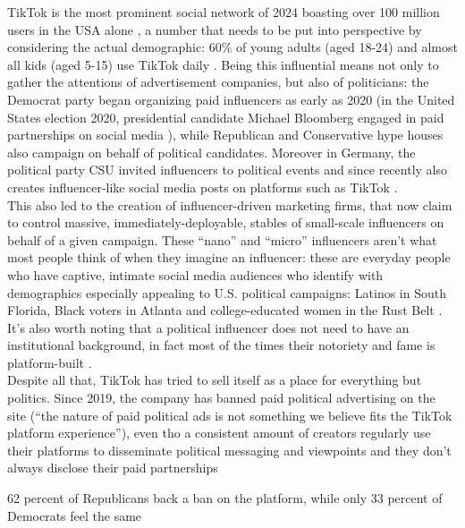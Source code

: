 TikTok is the most prominent social network of 2024 boasting over 100 million users in the USA alone \cite{tktkStat}, a number that needs to be put into perspective by considering the actual demographic: 60\% of young adults (aged 18-24) and almost all kids (aged 5-15) use TikTok daily \cite{https://doi.org/10.1002/poi3.287}. Being this influential means not only to gather the attentions of advertisement companies, but also of politicians: the Democrat party began organizing paid influencers as early as 2020 (in the United States election 2020, presidential candidate Michael Bloomberg engaged in paid partnerships on social media \cite{10.3389/fcomm.2021.752656}), while Republican and Conservative hype houses also campaign on behalf of political candidates. Moreover in Germany, the political party CSU invited influencers to political events and since recently also creates influencer-like social media posts on platforms such as TikTok \cite{10.3389/fcomm.2021.752656}.\\
This also led to the creation of influencer-driven marketing firms, that now claim to control massive, immediately-deployable, stables of small-scale influencers on behalf of a given campaign. These “nano” and “micro” influencers aren't what most people think of when they imagine an influencer: these are everyday people who have captive, intimate social media audiences who identify with demographics especially appealing to U.S. political campaigns: Latinos in South Florida, Black voters in Atlanta and college-educated women in the Rust Belt \cite{theHilltktk}. 
It's also worth noting that a political influencer does not need to have an institutional background, in fact most of the times their notoriety and fame is platform-built \cite{doi:10.1177/20563051231177938}.\\
Despite all that, TikTok has tried to sell itself as a place for everything but politics. Since 2019, the company has banned paid political advertising on the site (“the nature of paid political ads is not something we believe fits the TikTok platform experience”), even tho a consistent amount of creators regularly use their platforms to disseminate political messaging and viewpoints and they don't always disclose their paid partnerships

62 percent of Republicans back a ban on the platform, while only 33 percent of Democrats feel the same

